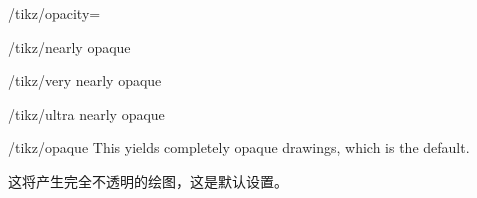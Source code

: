\begin{key}{/tikz/opacity=}
    \begin{stylekey}{/tikz/nearly opaque}
\begin{codeexample}[]
\end{codeexample}
    \end{stylekey}

    \begin{stylekey}{/tikz/very nearly opaque}
\begin{codeexample}[]
\end{codeexample}
    \end{stylekey}

    \begin{stylekey}{/tikz/ultra nearly opaque}
\begin{codeexample}[]
\end{codeexample}
    \end{stylekey}

    \begin{stylekey}{/tikz/opaque}
        This yields completely opaque drawings, which is the default.
        
        这将产生完全不透明的绘图，这是默认设置。

\begin{codeexample}[]
\end{codeexample}
    \end{stylekey}
\end{key}

